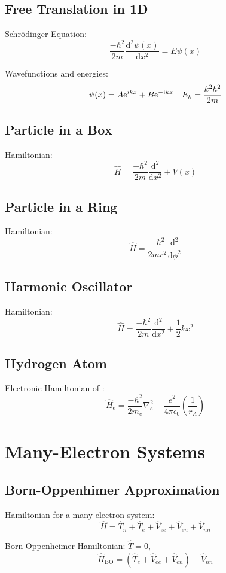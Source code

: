 \subsection*{Free Translation in 1D}
Schrödinger Equation:
$$\frac{-\hbar^2}{2m} \frac{\mathrm{d}^2\psi(x)}{\mathrm{d}x^2} =  E \psi(x)$$

Wavefunctions and energies:
$$\psi(x) = A {\rm e}^{ikx} + B {\rm e}^{-ikx} \quad E_k = \frac{k^2\hbar^2}{2m}$$


\subsection*{Particle in a Box}
Hamiltonian:
$$\hat{H} = \frac{-\hbar^2}{2m} \frac{\mathrm{d}^2}{\mathrm{d}x^2} + V(x)$$

\subsection*{Particle in a Ring}
Hamiltonian:
$$\hat{H} = \frac{-\hbar^2}{2mr^2} \frac{\mathrm{d}^2}{\mathrm{d}\phi^2}$$

\subsection*{Harmonic Oscillator}
Hamiltonian:
$$\hat{H} = \frac{-\hbar^2}{2m} \frac{\mathrm{d}^2}{\mathrm{d}x^2} + \frac{1}{2}kx^2$$

\subsection*{Hydrogen Atom}
Electronic Hamiltonian of :
$$\hat{H}_e = \frac{-\hbar^2}{2m_e}\nabla_e^2-\frac{e^2}{4\pi\epsilon_0} \left( \frac{1}{r_A} \right)$$

\section{Many-Electron Systems}
\subsection*{Born-Oppenhimer Approximation}

Hamiltonian for a many-electron system:
$$\hat{H} = \hat{T}_{n} + \hat{T}_{e} + \hat{V}_{ee} + \hat{V}_{en} + \hat{V}_{nn}$$

Born-Oppenheimer Hamiltonian: $\hat{T} = 0$,
$$\hat{H}_{\mathrm{BO}} = \left( \hat{T}_{e} + \hat{V}_{ee} + \hat{V}_{en} \right) + \hat{V}_{nn}$$

